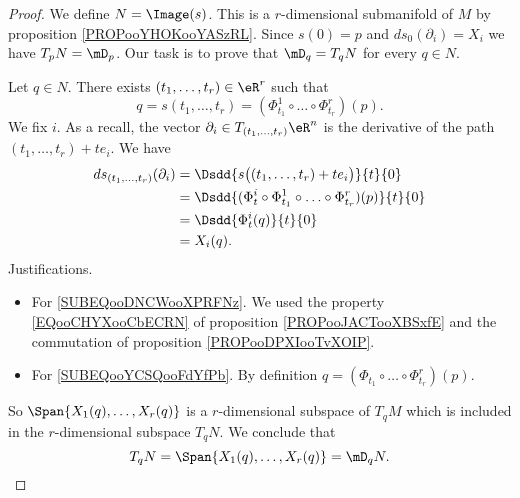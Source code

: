 \begin{proof}
	We define \( N=\Image(s)\). This is a \( r\)-dimensional submanifold of \( M\) by proposition \ref{PROPooYHOKooYASzRL}. Since \( s(0)=p\) and \( ds_0(\partial_i)=X_i\) we have \( T_pN=\mD_p\). Our task is to prove that \( \mD_q=T_qN\) for every \( q\in N\).

	Let \( q\in N\). There exists \( (t_1,\ldots, t_r)\in \eR^r\) such that
	\begin{equation}
		q=s(t_1,\ldots, t_r)=(\Phi_{t_1}^1\circ \ldots\circ\Phi_{t_r}^r)(p).
	\end{equation}
	We fix \( i\). As a recall, the vector \( \partial_i\in T_{(t_1,\ldots, t_r)}\eR^n\) is the derivative of the path \( (t_1,\ldots, t_r)+te_i\). We have
	\begin{subequations}
		\begin{align}
			ds_{(t_1,\ldots, t_r)}(\partial_i) & =\Dsdd{ s\big( (t_1,\ldots, t_r)+te_i \big) }{t}{0}                                                           \\
			                                   & =\Dsdd{ (\Phi_t^i\circ\Phi_{t_1}^1\circ\ldots\circ\Phi_{t_r}^r)(p)    }{t}{0}     \label{SUBEQooDNCWooXPRFNz} \\
			                                   & =\Dsdd{ \Phi_t^i(q) }{t}{0}        \label{SUBEQooYCSQooFdYfPb}                                                \\
			                                   & =X_i(q).
		\end{align}
	\end{subequations}
	Justifications.
	\begin{itemize}
		\item For \eqref{SUBEQooDNCWooXPRFNz}. We used the property \eqref{EQooCHYXooCbECRN} of proposition \ref{PROPooJACTooXBSxfE} and the commutation of proposition \ref{PROPooDPXIooTvXOIP}.
		\item For \eqref{SUBEQooYCSQooFdYfPb}. By definition \( q=(\Phi_{t_1}\circ\ldots\circ\Phi_{t_r}^r)(p)\).
	\end{itemize}
	So \( \Span\{ X_1(q),\ldots, X_r(q) \}\) is a \( r\)-dimensional subspace of \( T_qM\) which is included in the \( r\)-dimensional subspace \( T_qN\). We conclude that
	\begin{equation}
		T_qN=\Span\{ X_1(q),\ldots, X_r(q) \}=\mD_qN.
	\end{equation}
\end{proof}


